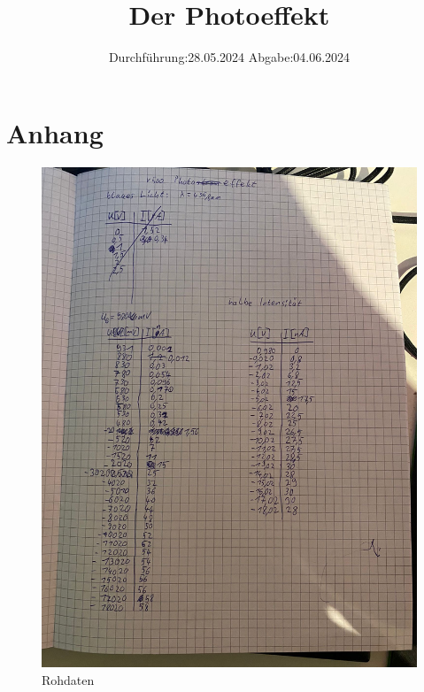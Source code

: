 

\subject{V500}
\title{Der Photoeffekt}
\date{%
  Durchführung:28.05.2024
  \hspace{3em}
  Abgabe:04.06.2024
}



\maketitle
\thispagestyle{empty}
\tableofcontents
\newpage






\printbibliography{}

\section{Anhang}
\begin{figure}[H]
  \includegraphics[width=\textwidth]{Bilder/Rohdaten1.jpg}
  \caption{Rohdaten}
\end{figure}
